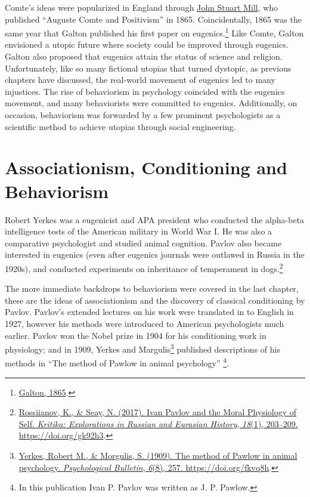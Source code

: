 \documentclass[
  oneside,
  12pt]{crumpbook}
\newenvironment{floatrightbox50}{%
  \wrapfigure{R}{.5\textwidth}%
  }{%
  \endwrapfigure}
\begin{document}
Comte's ideas were popularized in England through \href{https://en.wikipedia.org/wiki/John_Stuart_Mill}{John Stuart Mill}, who published ``Auguste Comte and Positivism'' in 1865. Coincidentally, 1865 was the same year that Galton published his first paper on eugenics.\footnote{\protect\hyperlink{ref-galtonHereditaryTalentCharacter1865}{Galton, 1865}.} Like Comte, Galton envisioned a utopic future where society could be improved through eugenics. Galton also proposed that eugenics attain the status of science and religion. Unfortunately, like so many fictional utopias that turned dystopic, as previous chapters have discussed, the real-world movement of eugenics led to many injustices. The rise of behaviorism in psychology coincided with the eugenics movement, and many behaviorists were committed to eugenics. Additionally, on occasion, behaviorism was forwarded by a few prominent psychologists as a scientific method to achieve utopias through social engineering.

\hypertarget{associationism-conditioning-and-behaviorism}{%
\section{Associationism, Conditioning and Behaviorism}\label{associationism-conditioning-and-behaviorism}}

\begin{floatrightbox50}
Robert Yerkes was a eugenicist and APA president who conducted the alpha-beta intelligence tests of the American military in World War I. He was also a comparative psychologist and studied animal cognition. Pavlov also became interested in eugenics (even after eugenics journals were outlawed in Russia in the 1920s), and conducted experiments on inheritance of temperament in dogs.\footnote{\protect\hyperlink{ref-rossiianovIvanPavlovMoral2017}{Rossiianov, K., \& Seay, N. (2017). Ivan {Pavlov} and the {Moral Physiology} of {Self}. \emph{Kritika: Explorations in Russian and Eurasian History}, \emph{18}(1), 203--209. \url{https://doi.org/gk92h3}}.}

\end{floatrightbox50}

The more immediate backdrops to behaviorism were covered in the last chapter, these are the ideas of associationism and the discovery of classical conditioning by Pavlov. Pavlov's extended lectures on his work were translated in to English in 1927, however his methods were introduced to American psychologists much earlier. Pavlov won the Nobel prize in 1904 for his conditioning work in physiology; and in 1909, Yerkes and Margulis\footnote{\protect\hyperlink{ref-yerkesMethodPawlowAnimal1909}{Yerkes, Robert M., \& Morgulis, S. (1909). The method of {Pawlow} in animal psychology. \emph{Psychological Bulletin}, \emph{6}(8), 257. \url{https://doi.org/fkvq8h}}.} published descriptions of his methods in ``The method of Pawlow in animal psychology'' \footnote{In this publication Ivan P. Pavlov was written as J. P. Pawlow.}.
\end{document}
